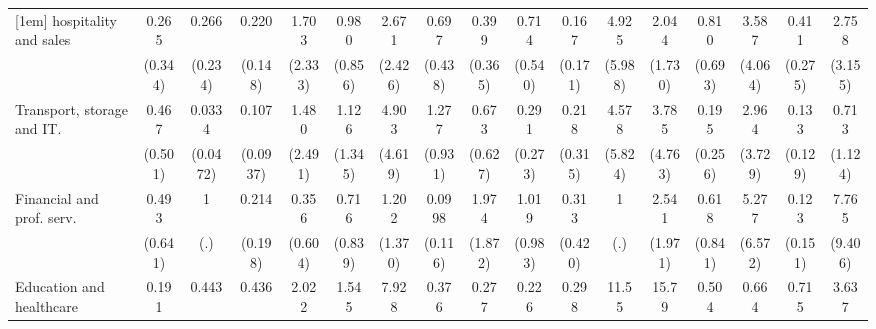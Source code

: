 {\begin{tabular}{l*{16}{c}}
[1em]
hospitality and sales&       0.265         &       0.266         &       0.220\sym{*}  &       1.703         &       0.980         &       2.671         &       0.697         &       0.399         &       0.714         &       0.167         &       4.925         &       2.044         &       0.810         &       3.587         &       0.411         &       2.758         \\
                    &     (0.344)         &     (0.234)         &     (0.148)         &     (2.333)         &     (0.856)         &     (2.426)         &     (0.438)         &     (0.365)         &     (0.540)         &     (0.171)         &     (5.988)         &     (1.730)         &     (0.693)         &     (4.064)         &     (0.275)         &     (3.155)         \\
[1em]
Transport, storage and IT.&       0.467         &      0.0334\sym{*}  &       0.107\sym{*}  &       1.480         &       1.126         &       4.903         &       1.277         &       0.673         &       0.291         &       0.218         &       4.578         &       3.785         &       0.195         &       2.964         &       0.133\sym{*}  &       0.713         \\
                    &     (0.501)         &    (0.0472)         &    (0.0937)         &     (2.491)         &     (1.345)         &     (4.619)         &     (0.931)         &     (0.627)         &     (0.273)         &     (0.315)         &     (5.824)         &     (4.763)         &     (0.256)         &     (3.729)         &     (0.129)         &     (1.124)         \\
[1em]
Financial and prof. serv.&       0.493         &           1         &       0.214         &       0.356         &       0.716         &       1.202         &      0.0998\sym{*}  &       1.974         &       1.019         &       0.313         &           1         &       2.541         &       0.618         &       5.277         &       0.123         &       7.765         \\
                    &     (0.641)         &         (.)         &     (0.198)         &     (0.604)         &     (0.839)         &     (1.370)         &     (0.116)         &     (1.872)         &     (0.983)         &     (0.420)         &         (.)         &     (1.971)         &     (0.841)         &     (6.572)         &     (0.151)         &     (9.406)         \\
[1em]
Education and healthcare&       0.191         &       0.443         &       0.436         &       2.022         &       1.545         &       7.928\sym{*}  &       0.376         &       0.277         &       0.226         &       0.298         &       11.55         &       15.79\sym{*}  &       0.504         &       0.664         &       0.715         &       3.637         \\

\end{tabular}}
